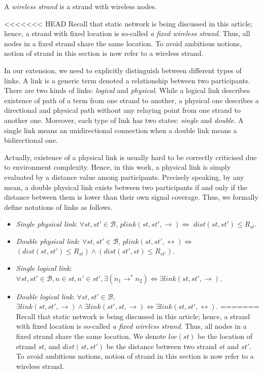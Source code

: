 \begin{flushleft}
\begin{flushleft}
\begin{Definition} A \emph{wireless strand} is a strand with wireless nodes.
\end{Definition}

<<<<<<< HEAD
Recall that static network is being discussed in this article; hence, a strand with fixed location is so-called \textit{a fixed wireless strand}. Thus, all nodes in a fixed strand share the same location. To avoid ambitious notions, notion of strand in this section is now refer to a wireless strand. 

In our extension, we need to explicitly distinguish between different types of links. A link is a generic term denoted a relationship between two participants. There are two kinds of links: \emph{logical} and \emph{physical}. While a logical link describes existence of path of a term from one strand to another, a physical one describes a directional and physical path without any relaying point from one strand to another one. Moreover, each type of link has two states: \emph{single} and \emph{double}. A single link means an unidirectional connection when a double link means a bidirectional one. 

Actually, existence of a physical link is usually hard to be correctly criticised due to environment complexity. Hence, in this work, a physical link is simply evaluated by a distance value among participants. Precisely speaking, by any mean, a double physical link exists between two participants if and only if the distance between them is lower than their own signal coverage. Thus, we formally define notations of links as follows.

\begin{Definition}
\begin{itemize}
\item \emph{Single physical link}: $\forall st,st' \in \mathcal{B}$, $plink(st,st', \rightarrow) \Leftrightarrow$ $dist(st,st') \le R_{st}$.
\item \emph{Double physical link}: $\forall st,st' \in \mathcal{B}$, $plink(st,st', \leftrightarrow) \Leftrightarrow$ $(dist(st,st') \le R_{st}) \wedge (dist(st',st) \le R_{st'})$.
\item \emph{Single logical link}: $\forall st, st' \in \mathcal{B}, n \in st, n' \in st', \exists (n_1 \rightarrow^* n_2) \Leftrightarrow \exists link(st, st',\rightarrow)$.
\item \emph{Double logical link}: $\forall st, st' \in \mathcal{B},$ $ \exists link(st, st',\rightarrow) \wedge \exists link(st', st,\rightarrow) \Leftrightarrow \exists link(st, st',\leftrightarrow)$.
=======
Recall that static network is being discussed in this article; hence, a strand with fixed location is so-called \textit{a fixed wireless strand}. Thus, all nodes in a fixed strand share the same location. We denote $loc(st)$ be the location of strand $st$, and $dist(st,st')$ be the distance between two strand $st$ and $st'$. To avoid ambitious notions, notion of strand in this section is now refer to a wireless strand. 


\end{itemize}
\end{Definition}
\end{flushleft}
\end{flushleft}
